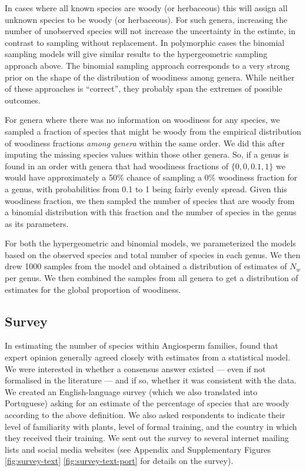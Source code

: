 \documentclass[a4paper,12pt]{article}
\begin{document}
In cases where all known species are woody (or herbaceous) this will
assign all unknown species to be woody (or herbaceous). For such genera,
increasing the number of unobserved species will not increase the uncertainty
in the estimte, in contrast to sampling without replacement.
In polymorphic
cases the binomial sampling models will give similar results to the 
hypergeometric sampling
approach above. The binomial sampling approach corresponds to a very strong 
prior on
the shape of the distribution of woodiness among genera.
While neither of these approaches is ``correct'', they probably
span the extremes of possible outcomes.

For genera where there was no information on woodiness for any
species, we sampled a fraction of species that might be woody from the
empirical distribution of woodiness fractions \textit{among genera}
within the same order. We did this after imputing the missing species
values within those other genera. So, if a genus is found in an order
with genera that had woodiness fractions of $\{0, 0, 0.1, 1\}$ we would
have approximately a 50\% chance of sampling a 0\% woodiness fraction
for a genus, with probabilities from 0.1 to 1 being fairly evenly
spread.  Given this woodiness fraction, we then sampled the number of
species that are woody from a binomial distribution with this fraction
and the number of species in the genus as its parameters.

For both the hypergeometric and binomial models, we parameterized the models
based on the observed species and total number of species in each genus. 
We then drew 1000 samples from the model and obtained a distribution of 
estimates of $N_w$ per genus. We then combined the samples from all genera to 
get a distribution of estimates for the global proportion of woodiness.

\subsection{Survey}

%
In estimating the number of species within Angiosperm families,
\citet{joppa2010} found that expert opinion generally agreed closely
with estimates from a statistical model.  We were interested in
whether a consensus answer existed --- even if not formalised in the
literature --- and if so, whether it was consistent with the data.
% 
We created an English-language survey (which we also translated into
Portuguese) asking for an estimate of the percentage of species that
are woody according to the above definition.  We also asked
respondents to indicate their level of familiarity with plants, level
of formal training, and the country in which they received their
training. We sent out the survey to several internet mailing lists and
social media websites (see Appendix and Supplementary Figures
\ref{fig:survey-text} \ref{fig:survey-text-port} for details on the survey).
\end{document}
